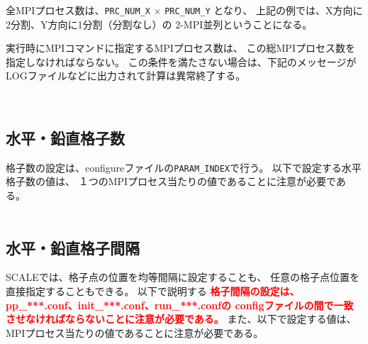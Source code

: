 全MPIプロセス数は、\verb|PRC_NUM_X| $\times$ \verb|PRC_NUM_Y|  となり、
上記の例では、X方向に2分割、Y方向に1分割（分割なし）の
2-MPI並列ということになる。

実行時にMPIコマンドに指定するMPIプロセス数は、
この総MPIプロセス数を指定しなければならない。
この条件を満たさない場合は、下記のメッセージが
LOGファイルなどに出力されて計算は異常終了する。

\\



\subsection{水平・鉛直格子数}

格子数の設定は、configureファイルの\verb|PARAM_INDEX|で行う。
以下で設定する水平格子数の値は、
１つのMPIプロセス当たりの値であることに注意が必要である。\\

\\



\subsection{水平・鉛直格子間隔}
\label{sec:gridinterv}
SCALEでは、格子点の位置を均等間隔に設定することも、
任意の格子点位置を直接指定することもできる。
以下で説明する
\textcolor{red}{\bf 格子間隔の設定は、pp\_***.conf、init\_***.conf、run\_***.confの
configファイルの間で一致させなければならないことに注意が必要である。}
また、以下で設定する値は、MPIプロセス当たりの値であることに注意が必要である。


